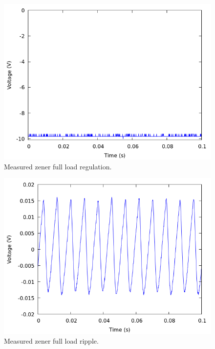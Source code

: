 \documentclass[12pt]{article}
\newcommand{\graphwidth}{0.5\linewidth}
\begin{document}
\begin{appendix}
\begin{figure}[H]
    \centering
    \includegraphics[width=\graphwidth]{./res/image/neg-full-load.png}
    \caption{Measured zener full load regulation.}
    \label{fig:neg_load_}
\end{figure}

\begin{figure}[H]
    \centering
    \includegraphics[width=\graphwidth]{./res/image/neg-full-load-ripple.png}
    \caption{Measured zener full load ripple.}
    \label{fig:neg_load_ripple}
\end{figure}

\end{appendix}
\end{document}
